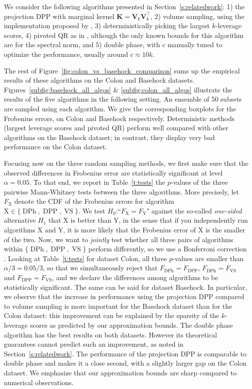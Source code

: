 \documentclass[twoside,11pt]{book}
\numberwithin{theorem}{chapter}
\numberwithin{definition}{chapter}
\numberwithin{proposition}{chapter}
\numberwithin{corollary}{chapter}
\numberwithin{example}{chapter}
\numberwithin{lemma}{chapter}
\numberwithin{assumption}{chapter}
\DeclareMathOperator{\DPP}{\mathrm{DPP}}
\DeclareMathOperator{\VS}{\mathrm{VS}}
\DeclareMathOperator{\Tran}{\intercal}
\DeclareMathOperator{\DPh}{\mathrm{DPh}}
\begin{document}
We consider the following algorithms presented in Section~\ref{s:relatedwork}: 1) the projection DPP with marginal kernel $\bm{K}=\bm{V}_{k}^{}\bm{V}_{k}^{\Tran}$, 2) volume sampling, using the implementation proposed by \cite{KuTa11}, 3) deterministically picking the largest $k$-leverage scores, 4) pivoted QR as in \cite{Golu65}, although the only known bounds for this algorithm are for the spectral norm, and 5) double phase, with $c$ manually tuned to optimize the performance, usually around $c \approx 10k$.

The rest of Figure~\ref{fig:colon_vs_basehock_comparison} sums up the empirical results of these algorithms on the Colon and Basehock datasets.
%
Figures~\ref{subfig:basehock_all_algos} \& \ref{subfig:colon_all_algos} illustrate the results of the five algorithms in the following setting. An ensemble of 50 subsets are sampled using each algorithm. We give the corresponding boxplots for the Frobenius errors, on Colon and Basehock respectively.
%
Deterministic methods (largest leverage scores and pivoted QR) perform well compared with other algorithms on the Basehock dataset; in contrast, they display very bad performance on the Colon dataset.

Focusing now on the three random sampling methods, we first make sure that the observed differences in Frobenius error are statistically significant at level $\alpha=0.05$. To that end, we report in Table~\ref{t:tests} the $p$-values of the three pairwise Mann-Whitney tests between the three algorithms. More precisely, let $F_\text{X}$ denote the CDF of the Frobenius errors for algorithm $\text{X}\in\{\DPh,\DPP,\VS\}$. We test $H_0$:``$F_\text{X}=F_\text{Y}$" against the so-called \emph{one-sided} alternative $H_1$ that X is better than Y, in the sense that if you independently run algorithms X and Y, it is more likely that the Frobenius error of X is the smaller of the two. Now, we want to \emph{jointly} test whether all three pairs of algorithms within $\{\DPh,\DPP,\VS\}$ perform differently, so we use a Bonferroni correction \citep{Was13}. Looking at Table~\ref{t:tests} for dataset Colon, all three $p$-values are smaller than $\alpha/3=0.05/3$, so that we simultaneously reject that $F_{\DPh}=F_{\DPP}$, $F_{\DPh}=F_{\VS}$ and $F_{\DPP}=F_{\VS}$, and we declare the differences among algorithms to be statistically significant. The same can be said for dataset Basehock. In particular, we observe that the increase in performance using the projection DPP compared to volume sampling is more important for the Basehock dataset than for the Colon dataset: this improvement can be explained by the sparsity of the $k$-leverage scores as predicted by our approximation bounds.
%
The double phase algorithm has the best results on both datasets. However its theoretical guarantees cannot predict such an improvement, as noted in Section~\ref{s:relatedwork}. The performance of the projection DPP is comparable to double phase and makes it a close second, with a slightly larger gap on the Colon dataset. We emphasize that our approximation bounds are sharp compared to numerical observations.
\end{document}

